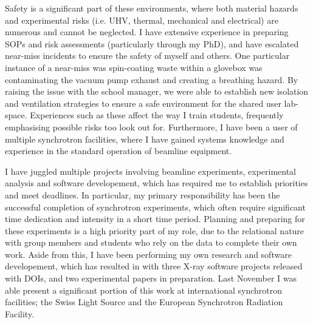 \documentclass[10pt,a4paper,ragged2e,withhyper,paragraphstrue]{altacv}
\begin{document}
{    %
    Safety is a significant part of these environments, where both material hazards and experimental risks (i.e. UHV, thermal, mechanical and electrical) are numerous and cannot be neglected. I have extensive experience in preparing SOPs and risk assessments (particularly through my PhD), and have escalated near-miss incidents to ensure the safety of myself and others. One particular instance of a near-miss was spin-coating waste within a glovebox was contaminating the vacuum pump exhaust and creating a breathing hazard. By raising the issue with the school manager, we were able to establish new isolation and ventilation strategies to ensure a safe environment for the shared user lab-space. Experiences such as these affect the way I train students, frequently emphasising possible risks too look out for. Furthermore, I have been a user of multiple synchrotron facilities, where I have gained systems knowledge and experience in the standard operation of beamline equipment.
    
    I have juggled multiple projects involving beamline experiments, experimental analysis and software developement, which has required me to establish priorities and meet deadlines. In particular, my primary responsibility has been the successful completion of synchrotron experiments, which often require significant time dedication and intensity in a short time period. Planning and preparing for these experiments is a high priority part of my role, due to the relational nature with group members and students who rely on the data to complete their own work. Aside from this, I have been performing my own research and software developement, which has resulted in with three X-ray software projects released with DOIs, and two experimental papers in preparation. Last November I was able present a significant portion of this work at international synchrotron facilities; the Swiss Light Source and the European Synchrotron Radiation Facility.

}
\end{document}
